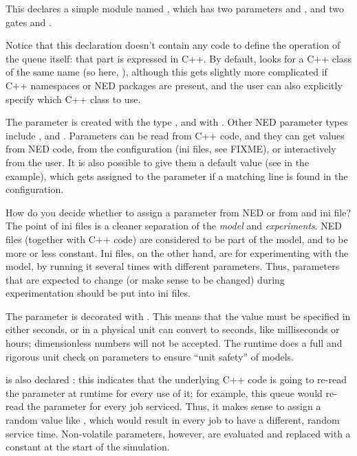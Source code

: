This declares a simple module named , which has two parameters
 and , and two gates  and .

Notice that this declaration doesn't contain any code to define the operation
of the queue itself: that part is expressed in C++. By default, \opp looks for a
C++ class of the same name (so here, ), although this gets slightly
more complicated if C++ namespaces or NED packages are present, and the user
can also explicitly specify which C++ class to use.

The  parameter is created with the type , and
 with . Other NED parameter types include
,  and . Parameters can be read from C++ code,
and they can get values from NED code, from the configuration (ini files, see
FIXME), or interactively from the user. It is also possible to give them a default value (see
 in the example), which gets assigned to the parameter if a
matching  line is found in the configuration.

\begin{note}
    How do you decide whether to assign a parameter from NED or from and ini
    file? The point of ini files is a cleaner separation of the \textit{model}
    and \textit{experiments}. NED files (together with C++ code) are considered
    to be part of the model, and to be more or less constant. Ini files, on
    the other hand, are for experimenting with the model, by running it
    several times with different parameters. Thus, parameters that are expected
    to change (or make sense to be changed) during experimentation should be
    put into ini files.
\end{note}

The  parameter is decorated with . This means
that the value must be specified in either seconds, or in a physical unit \opp
can convert to seconds, like milliseconds or hours; dimensionless numbers
will not be accepted. The \opp runtime does a full and rigorous unit check on
parameters to ensure ``unit safety'' of models.

 is also declared : this indicates that the
underlying C++ code is going to re-read the parameter at runtime for every
use of it; for example, this queue would re-read the parameter for every job
serviced. Thus, it makes sense to assign  a random value like
, which would result in every job to have a different,
random service time. Non-volatile parameters, however, are evaluated and
replaced with a constant at the start of the simulation.


